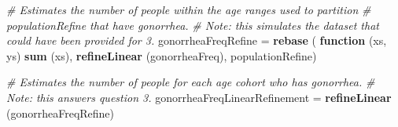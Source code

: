 \documentclass[]{article}
\newenvironment{Shaded}{}{}
\newcommand{\CommentTok}[1]{\textcolor[rgb]{0.38,0.63,0.69}{\textit{#1}}}
\newcommand{\ControlFlowTok}[1]{\textcolor[rgb]{0.00,0.44,0.13}{\textbf{#1}}}
\newcommand{\KeywordTok}[1]{\textcolor[rgb]{0.00,0.44,0.13}{\textbf{#1}}}
\newcommand{\NormalTok}[1]{#1}
\newcommand{\StringTok}[1]{\textcolor[rgb]{0.25,0.44,0.63}{#1}}
\begin{document}
\begin{Shaded}
\begin{Highlighting}[]
\CommentTok{# Estimates the number of people within the age ranges used to partition}
\CommentTok{#   populationRefine that have gonorrhea.}
\CommentTok{# Note: this simulates the dataset that could have been provided for 3.}
\NormalTok{gonorrheaFreqRefine =}\StringTok{ }\KeywordTok{rebase}\NormalTok{ (}
  \ControlFlowTok{function}\NormalTok{ (xs, ys) }\KeywordTok{sum}\NormalTok{ (xs),}
  \KeywordTok{refineLinear}\NormalTok{ (gonorrheaFreq),}
\NormalTok{  populationRefine) }

\CommentTok{# Estimates the number of people for each age cohort who has gonorrhea.}
\CommentTok{# Note: this answers question 3.}
\NormalTok{gonorrheaFreqLinearRefinement =}\StringTok{ }\KeywordTok{refineLinear}\NormalTok{ (gonorrheaFreqRefine)}
\end{Highlighting}
\end{Shaded}
\end{document}
